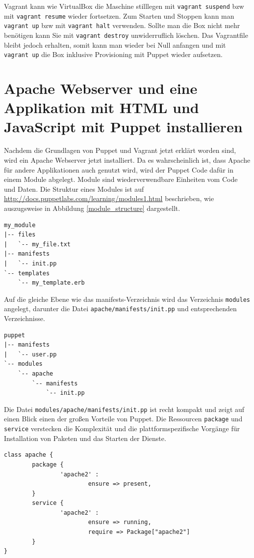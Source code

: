 \documentclass[12pt,a4paper,ngerman]{article}
\begin{document}
Vagrant kann wie VirtualBox die Maschine stilllegen mit \lstinline$vagrant suspend$ bzw mit \lstinline$vagrant resume$ wieder fortsetzen. Zum Starten und Stoppen kann man \lstinline$vagrant up$ bzw mit \lstinline$vagrant halt$ verwenden.  Sollte man die Box nicht mehr benötigen kann Sie mit \lstinline$vagrant destroy$ unwiderruflich löschen. Das Vagrantfile bleibt jedoch erhalten, somit kann man wieder bei Null anfangen und mit \lstinline$vagrant up$ die Box inklusive Provisioning mit Puppet wieder aufsetzen.

\section{Apache Webserver und eine Applikation mit HTML und JavaScript mit Puppet installieren}
Nachdem die Grundlagen von Puppet und Vagrant jetzt erklärt worden sind, wird ein Apache Webserver jetzt installiert. Da es wahrscheinlich ist, dass Apache für andere Applikationen auch genutzt wird, wird der Puppet Code dafür in einem Module abgelegt. Module sind wiederverwendbare Einheiten vom Code und Daten. Die Struktur eines Modules ist auf \url{http://docs.puppetlabs.com/learning/modules1.html} beschrieben, wie auszugsweise in Abbildung \ref{module_structure} dargestellt.
\begin{lstlisting}[language=tree,caption=Puppet Module Struktur, label=module_structure]
my_module
|-- files
|   `-- my_file.txt
|-- manifests
|   `-- init.pp
`-- templates
    `-- my_template.erb
\end{lstlisting}


Auf die gleiche Ebene wie das manifests-Verzeichnis wird das Verzeichnis \lstinline$modules$ angelegt, darunter die Datei \lstinline$apache/manifests/init.pp$ und entsprechenden Verzeichnisse.
\begin{lstlisting}[language=tree,caption=Verzeichnisstruktur für den apache-Module, label=apache-module]
puppet
|-- manifests
|   `-- user.pp
`-- modules
    `-- apache
        `-- manifests
            `-- init.pp
\end{lstlisting}

Die Datei \lstinline$modules/apache/manifests/init.pp$ ist recht kompakt und zeigt auf einen Blick einen der großen Vorteile von Puppet. Die Ressourcen \lstinline$package$ und \lstinline$service$ verstecken die Komplexität und die plattformspezifische Vorgänge für Installation von Paketen und das Starten der Dienste.
\begin{lstlisting}[language=puppet,caption=Inhalt von modules/apache/manifests/init.pp, label=apache-init.pp]
class apache {
        package {
                'apache2' :
                        ensure => present,
        }
        service {
                'apache2' :
                        ensure => running,
                        require => Package["apache2"]
        }
}
\end{lstlisting}
\end{document}

